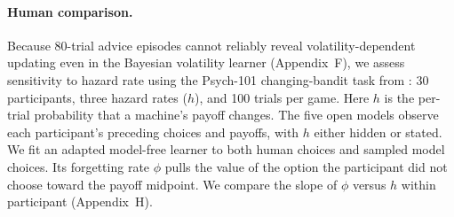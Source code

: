 \documentclass[letterpaper]{article} %
\begin{document}
\paragraph{Human comparison.} Because 80-trial advice episodes cannot reliably reveal volatility-dependent updating even in the Bayesian volatility learner (Appendix~F), we assess sensitivity to hazard rate using the Psych-101 changing-bandit task from \citet{xiong2023neural}: 30 participants, three hazard rates ($h$), and 100 trials per game. Here $h$ is the per-trial probability that a machine's payoff changes. The five open models observe each participant's preceding choices and payoffs, with $h$ either hidden or stated. We fit an adapted model-free learner to both human choices and sampled model choices. Its forgetting rate $\phi$ pulls the value of the option the participant did not choose toward the payoff midpoint. We compare the slope of $\phi$ versus $h$ within participant (Appendix~H).
\end{document}
